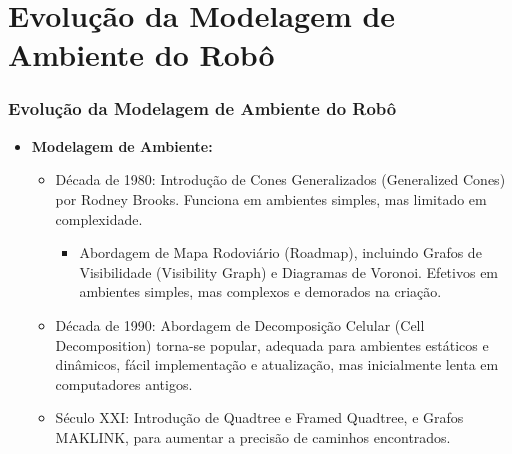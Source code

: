 \documentclass[xcolor=dvipsnames, aspectratio=169]{beamer}
\begin{document}
\section{Evolução da Modelagem de Ambiente do Robô}
\begin{frame}
  \frametitle{Evolução da Modelagem de Ambiente do Robô}
  \begin{itemize}
    \item \textbf{Modelagem de Ambiente:} 
    \begin{itemize}
        \item Década de 1980: Introdução de Cones Generalizados (Generalized Cones) por Rodney Brooks. Funciona em ambientes simples, mas limitado em complexidade.
        \begin{itemize}
          \item Abordagem de Mapa Rodoviário (Roadmap), incluindo Grafos de Visibilidade (Visibility Graph) e Diagramas de Voronoi. Efetivos em ambientes simples, mas complexos e demorados na criação.
        \end{itemize}
        \item Década de 1990: Abordagem de Decomposição Celular (Cell Decomposition) torna-se popular, adequada para ambientes estáticos e dinâmicos, fácil implementação e atualização, mas inicialmente lenta em computadores antigos.
        \item Século XXI: Introdução de Quadtree e Framed Quadtree, e Grafos MAKLINK, para aumentar a precisão de caminhos encontrados.
    \end{itemize}
  \end{itemize}
  
\end{frame}


\end{document}
